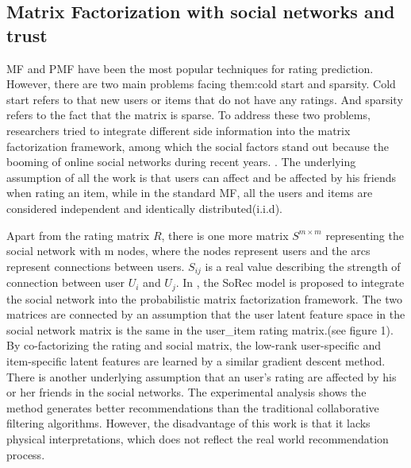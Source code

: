 \subsection{Matrix Factorization with social networks and trust}
MF and PMF have been the most popular techniques for rating prediction. However, there are two main problems facing them:cold start and sparsity. Cold start refers to that new users or items that do not have any ratings. And sparsity refers to the fact that the matrix is sparse. To address these two problems, researchers tried to integrate different side information into the matrix factorization framework, among which the social factors stand out because the booming of online social networks during recent years. \cite{jamali2010matrix}\cite{ma2009llearningEnsembel}\cite{ma2009learningTrust}\cite{ma2008sorec}\cite{ma2011recommender}\cite{massa2004trust}\cite{yang2013social}. The underlying assumption of all the work is that users can affect and be affected by his friends when rating an item, while in the standard MF, all the users and items are considered independent and identically distributed(i.i.d).

Apart from the rating matrix $R$, there is one more matrix $S^{m \times m}$ representing the social network with m nodes, where the nodes represent users and the arcs represent connections between users. $S_{ij}$ is a real value describing the strength of connection between user $U_i$ and $U_j$. In \cite{ma2008sorec}, the SoRec model is proposed to integrate the social network into the probabilistic matrix factorization framework. The two matrices are connected by an assumption that the user latent feature space in the social network matrix is the same in the user\_item rating matrix.(see figure 1). By co-factorizing the rating and social matrix, the low-rank user-specific and item-specific latent features are learned by a similar gradient descent method. There is another underlying assumption that an user's rating are affected by his or her friends in the social networks. The experimental analysis shows the method generates better recommendations than the traditional collaborative filtering algorithms. However, the disadvantage of this work is that it lacks physical interpretations, which does not reflect the real world recommendation process.

